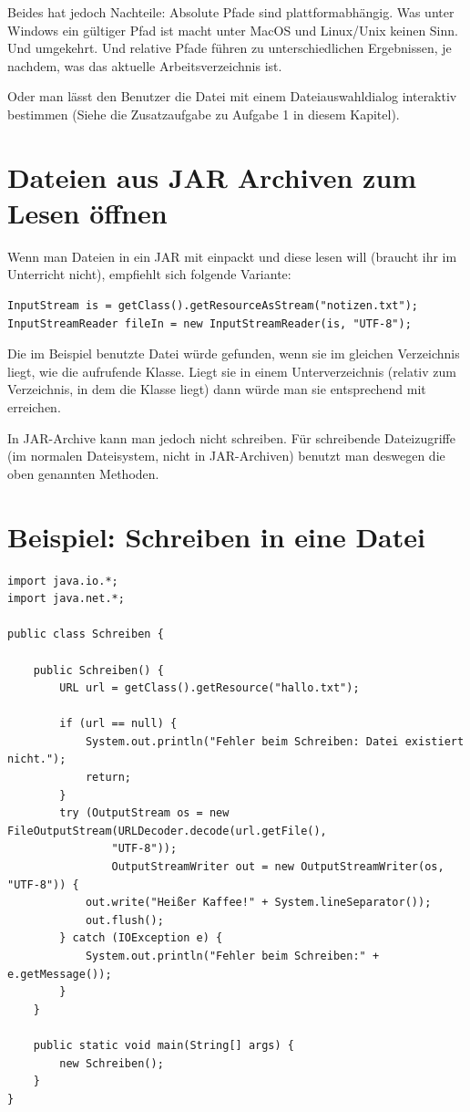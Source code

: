 Beides hat jedoch Nachteile: Absolute Pfade sind plattformabhängig. Was unter
Windows ein gültiger Pfad ist macht unter MacOS und Linux/Unix keinen Sinn. Und
umgekehrt. Und relative Pfade führen zu unterschiedlichen Ergebnissen, je
nachdem, was das aktuelle Arbeitsverzeichnis ist.

Oder man lässt den Benutzer die Datei mit einem Dateiauswahldialog interaktiv
bestimmen (Siehe die Zusatzaufgabe zu Aufgabe 1 in diesem Kapitel).


\section{Dateien aus JAR Archiven zum Lesen öffnen}

Wenn man Dateien in ein JAR mit einpackt und diese lesen will (braucht ihr im
Unterricht nicht), empfiehlt sich folgende Variante:

\begin{lstlisting}
InputStream is = getClass().getResourceAsStream("notizen.txt");
InputStreamReader fileIn = new InputStreamReader(is, "UTF-8");
\end{lstlisting}

Die im Beispiel benutzte Datei  würde gefunden, wenn sie im
gleichen Verzeichnis liegt, wie die aufrufende Klasse. Liegt sie in einem
Unterverzeichnis (relativ zum Verzeichnis, in dem die Klasse liegt) dann würde
man sie entsprechend mit  erreichen.

In JAR-Archive kann man jedoch nicht schreiben. Für schreibende Dateizugriffe
(im normalen Dateisystem, nicht in JAR-Archiven) benutzt man deswegen die oben
genannten Methoden.


\section{Beispiel: Schreiben in eine Datei}

\begin{lstlisting}
import java.io.*;
import java.net.*;

public class Schreiben {
	
    public Schreiben() {
        URL url = getClass().getResource("hallo.txt");

        if (url == null) {
            System.out.println("Fehler beim Schreiben: Datei existiert nicht.");
            return;
        }
        try (OutputStream os = new FileOutputStream(URLDecoder.decode(url.getFile(), 
                "UTF-8"));
                OutputStreamWriter out = new OutputStreamWriter(os, "UTF-8")) {
            out.write("Heißer Kaffee!" + System.lineSeparator());
            out.flush();
        } catch (IOException e) {
            System.out.println("Fehler beim Schreiben:" + e.getMessage());
        }
    }

    public static void main(String[] args) {
        new Schreiben();
    }
}
\end{lstlisting}


